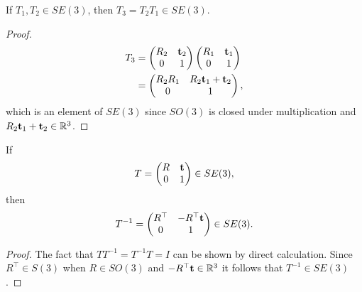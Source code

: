 \begin{lemma}
If $T_1, T_2\in SE(3)$, then $T_3=T_2 T_1 \in SE(3)$.
\end{lemma}
\begin{proof}
	\begin{align*}
	T_3 &= \begin{pmatrix} R_2 & \mathbf{t}_2 \\ 0 & 1 \end{pmatrix} \begin{pmatrix} R_1 & \mathbf{t}_1 \\ 0 & 1 \end{pmatrix} \\
	    &= \begin{pmatrix} R_2 R_1 & R_2\mathbf{t}_1 + \mathbf{t}_2 \\ 0 & 1 \end{pmatrix},
	\end{align*}
	which is an element of $SE(3)$ since $SO(3)$ is closed under multiplication and $R_2\mathbf{t}_1 + \mathbf{t}_2\in\mathbb{R}^3$.
\end{proof}

\begin{lemma}[Inverse]
If 
\[
T=\begin{pmatrix} R & \mathbf{t} \\ 0 & 1\end{pmatrix} \in SE(3),
\]	
then 
\[
T^{-1} =\begin{pmatrix} R^\top & -R^\top\mathbf{t} \\ 0 & 1\end{pmatrix} \in SE(3).
\]
\end{lemma}
\begin{proof}
The fact that $TT^{-1} = T^{-1}T = I$ can be shown by direct calculation.  Since $R^\top\in S(3)$ when $R\in SO(3)$ and $-R^\top\mathbf{t}\in\mathbb{R}^3$ it follows that $T^{-1}\in SE(3)$.
\end{proof}

